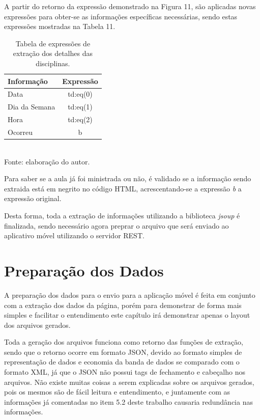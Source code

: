 
A partir do retorno da expressão demonstrado na Figura 11, são aplicadas novas expressões para obter-se as informações específicas necessárias, sendo estas expressões mostradas na Tabela 11.

\begin{table}[!hbt]
\centering
\caption[Extração de Informações - Expressões de Extração dos Detalhes da Disciplina]{Tabela de expressões de extração dos detalhes das disciplinas.}
\vspace{3mm}
\begin{tabular}{p{3cm}|c}\hline
\bf{Informação} & \bf{Expressão}                                 \\ \hline
Data            & td:eq(0) \\ \hline
Dia da Semana   & td:eq(1) \\ \hline
Hora            & td:eq(2) \\ \hline
Ocorreu         & b        \\ \hline
\end{tabular}
\\ Fonte: elaboração do autor.
\end{table}

Para saber se a aula já foi ministrada ou não, é validado se a informação sendo extraida está em negrito no código HTML, acrescentando-se a expressão \emph{b} a expressão original.

Desta forma, toda a extração de informações utilizando a biblioteca \emph{jsoup} é finalizada, sendo necessário agora preprar o arquivo que será enviado ao aplicativo móvel utilizando o servidor REST.

\section{Preparação dos Dados}
A preparação dos dados para o envio para a aplicação móvel é feita em conjunto com a extração dos dados da página, porém para demonstrar de forma mais simples e facilitar o entendimento este capítulo irá demonstrar apenas o layout dos arquivos gerados. 

Toda a geração dos arquivos funciona como retorno das funções de extração, sendo que o retorno ocorre em formato JSON, devido ao formato simples de representação de dados e economia da banda de dados se comparado com o formato XML, já que o JSON não possui tags de fechamento e cabeçalho nos arquivos. Não existe muitas coisas a serem explicadas sobre os arquivos gerados, pois os mesmos são de fácil leitura e entendimento, e juntamente com as informações já comentadas no item 5.2 deste trabalho causaria redundância nas informações.

